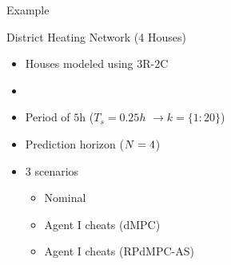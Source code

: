 \documentclass[aspectratio=169]{beamer}
\begin{document}
\begin{frame}{Example}
\begin{minipage}[c]{.35\textwidth}
{\begin{tikzpicture}[node distance=.5cm and .75cm,scale=1]
      \end{tikzpicture}
    }
  \end{minipage}
  \hfill
  \begin{minipage}[c]{.6\textwidth}
    \begin{exampleblock}{District Heating Network (4 Houses)}
      \begin{itemize}
        \item Houses modeled using 3R-2C
        \item {}
        \item Period of ${5} \mathrm{h}$ ($T_{s}=0.25h$ $\to k=\{1\mathbin{:}20\}$)
        \item Prediction horizon ($\predhorz =4$)
        \item 3 scenarios
              \begin{itemize}
                \item[\encircle{N}] Nominal
                \item[\encircle{C}] Agent I cheats (dMPC)
                \item[\encircle{S}] Agent I cheats (RPdMPC-AS)
              \end{itemize}
      \end{itemize}
    \end{exampleblock}
  \end{minipage}
\end{frame}
\end{document}
